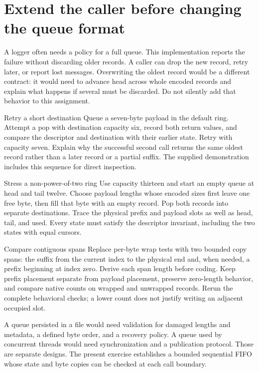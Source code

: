 \section{Extend the caller before changing the queue format}
A logger often needs a policy for a full queue. This implementation reports the
failure without discarding older records. A caller can drop the new record, retry
later, or report lost messages. Overwriting the oldest record would be a different
contract: it would need to advance head across whole encoded records and explain
what happens if several must be discarded. Do not silently add that behavior to
this assignment.

\begin{MARSExercise}{Retry a short destination}
  Queue a seven-byte payload in the default ring. Attempt a pop with destination
  capacity six, record both return values, and compare the descriptor and destination
  with their earlier state. Retry with capacity seven. Explain why the successful
  second call returns the same oldest record rather than a later record or a partial
  suffix. The supplied demonstration includes this sequence for direct inspection.
\end{MARSExercise}

\begin{MARSExercise}{Stress a non-power-of-two ring}
  Use capacity thirteen and start an empty queue at head and tail twelve. Choose
  payload lengths whose encoded sizes first leave one free byte, then fill that
  byte with an empty record. Pop both records into separate destinations. Trace the
  physical prefix and payload slots as well as head, tail, and used. Every state must
  satisfy the descriptor invariant, including the two states with equal cursors.
\end{MARSExercise}

\begin{MARSExercise}{Compare contiguous spans}
  Replace per-byte wrap tests with two bounded copy spans: the suffix from the current
  index to the physical end and, when needed, a prefix beginning at index zero.
  Derive each span length before coding. Keep prefix placement separate from payload
  placement, preserve zero-length behavior, and compare native counts on wrapped and
  unwrapped records. Rerun the complete behavioral checks; a lower count does not
  justify writing an adjacent occupied slot.
\end{MARSExercise}

A queue persisted in a file would need validation for damaged lengths and metadata,
a defined byte order, and a recovery policy. A queue used by concurrent threads
would need synchronization and a publication protocol. Those are separate designs.
The present exercise establishes a bounded sequential FIFO whose state and byte
copies can be checked at each call boundary.
